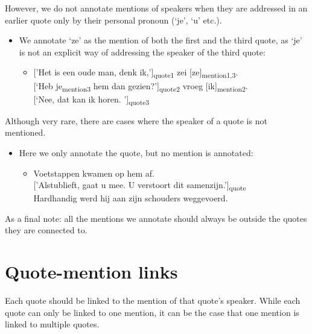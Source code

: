 \noindent However, we do not annotate mentions of speakers when they are addressed in an earlier quote only by their personal pronoun (`je', `u' etc.).
\begin{itemize}
\item We annotate `ze' as the mention of both the first and the third quote, as `je' is not an explicit way of addressing the speaker of the third quote:
    \begin{itemize}[label={}]
        \item  {[}'Het is een oude man, denk ik,'{]}\textsubscript{quote1} zei [ze]\textsubscript{mention1,3}. \\
        {[}`Heb \n{[}je\n{]}\textsubscript{mention3} hem dan gezien?'{]}\textsubscript{quote2} vroeg [ik]\textsubscript{mention2}. \\
        {[}`Nee, dat kan ik horen. '{]}\textsubscript{quote3}
    \end{itemize}    
\end{itemize}

\noindent Although very rare, there are cases where the speaker of a quote is not mentioned.
\begin{itemize}
\item Here we only annotate the quote, but no mention is annotated:
    \begin{itemize}[label={}]
        \item  Voetstappen kwamen op hem af. \\
        {[}'Alstublieft, gaat u mee. U verstoort dit samenzijn.'{]}\textsubscript{quote}\\
        Hardhandig werd hij aan zijn schouders weggevoerd.
    \end{itemize}    
\end{itemize}

\noindent As a final note: all the mentions we annotate should always be outside the quotes they are connected to.

\section{Quote-mention links}
Each quote should be linked to the mention of that quote's speaker.
While each quote can only be linked to one mention, it can be the case that one mention is linked to multiple quotes.

